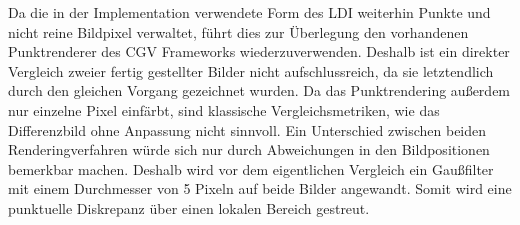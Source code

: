 \documentclass[hyperref, beleg, german]{cgvpub}
\begin{document}
Da die in der Implementation verwendete Form des LDI weiterhin Punkte und nicht
reine Bildpixel verwaltet, führt dies zur Überlegung den vorhandenen
Punktrenderer des CGV Frameworks wiederzuverwenden. Deshalb ist ein direkter
Vergleich zweier fertig gestellter Bilder nicht aufschlussreich, da sie
letztendlich durch den gleichen Vorgang gezeichnet wurden. Da das
Punktrendering außerdem nur einzelne Pixel einfärbt, sind klassische
Vergleichsmetriken, wie das Differenzbild ohne Anpassung nicht sinnvoll. Ein
Unterschied zwischen beiden Renderingverfahren würde sich nur durch
Abweichungen in den Bildpositionen bemerkbar machen. Deshalb wird vor dem
eigentlichen Vergleich ein Gaußfilter mit einem Durchmesser von 5 Pixeln auf
beide Bilder angewandt. Somit wird eine punktuelle Diskrepanz über einen
lokalen Bereich gestreut.
\end{document}

